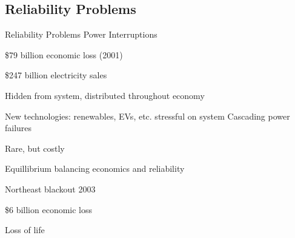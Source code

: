 
\subsection{Reliability Problems}
\begin{frame}{Reliability Problems}
\alert{Power Interruptions}
\bi
\item \$79 billion economic loss (2001) 
\bi
\item \$247 billion electricity sales
\ei 
\item Hidden from system, distributed throughout economy
\item New technologies: renewables, EVs, etc. stressful on system
\ei
\pause
\alert{Cascading power failures}
\bi
\item Rare, but costly
\item Equillibrium balancing economics and reliability
\item Northeast blackout 2003
\bi
\item \$6 billion economic loss
\item Loss of life
\ei
\ei
\end{frame}